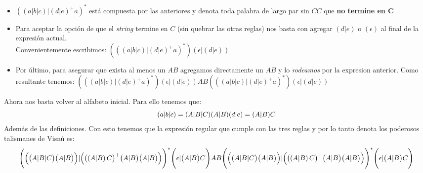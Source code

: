 \documentclass[spanish, fleqn]{article}
\begin{document}
\begin{enumerate}
\begin{itemize}
				\item
					\( ( (a|b|c) | (d|e)^+a ) ^* \) está compuesta por las
					anteriores y denota toda palabra de largo par sin \(CC\)
					que \textbf{no termine en C}
				\item
					Para aceptar la opción de que el \emph{string} termine en
					\(C\) (sin quebrar las otras reglas) nos basta con agregar
					\((d|e)\) o \((\epsilon)\) al final de la expresión actual.
					\\Convenientemente escribimos: 
					\( (( (a|b|c) | (d|e)^+a ) ^*)(\epsilon | (d|e)) \)
				\item
					Por último, para asegurar que exista al menos un \(AB\)
					agregamos directamente un \(AB\) y lo \emph{rodeamos} por
					la expresion anterior. Como resultante tenemos:
					\( (( (a|b|c) | (d|e)^+a ) ^*)(\epsilon | (d|e)) 
					AB
					 (( (a|b|c) | (d|e)^+a ) ^*)(\epsilon | (d|e))\)
			\end{itemize}
			Ahora nos basta volver al alfabeto inicial. Para ello tenemos que:
			\begin{equation*}
				(a|b|c) = (A|B|C)(A|B) \\
				(d|e) = (A|B)C 
			\end{equation*}
			Además de las definiciones. Con esto tenemos que la expresión 
			regular que cumple con las tres reglas y por lo tanto denota los 
			poderosos talismanes de Visnú es:
			\begin{equation*}
				\Biggl(
					\Bigl(
						\bigl( A|B|C \bigr)
						\bigl(A|B \bigr)
					\Bigr)
					|
					\Bigl(
						\bigl(
							\left( A|B \right)
						C \bigr)^+ 
						\bigl( A|B \bigr)
						\bigl( A|B \bigr) 
					\Bigr)
				\Biggr)^* 
				\Biggl(
					\epsilon 
					| 
					\bigl( A|B \bigr) C
				\Biggr)
				AB
				\Biggl(
					\Bigl(
						\bigl( A|B|C \bigr)
						\bigl(A|B \bigr)
					\Bigr)
					|
					\Bigl(
						\bigl(
							\left( A|B \right)
						C \bigr)^+ 
						\bigl( A|B \bigr)
						\bigl( A|B \bigr) 
					\Bigr)
				\Biggr)^* 
				\Biggl(
					\epsilon 
					| 
					\bigl( A|B \bigr) C
				\Biggr)
			\end{equation*}


\end{enumerate}
\end{document}
